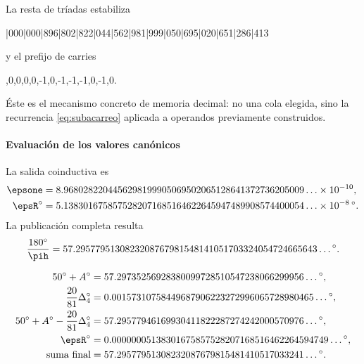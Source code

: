 La resta de tríadas estabiliza
\begin{center}
|000|000|896|802|822|044|562|981|999|050|695|020|651|286|413
\end{center}
y el prefijo de carries
\begin{center}
,0,0,0,0,-1,0,-1,-1,-1,0,-1,0.
\end{center}
Éste es el mecanismo concreto de memoria decimal: no una cola elegida, sino
la recurrencia \eqref{eq:subacarreo} aplicada a operandos previamente
construidos.

\paragraph{Evaluación de los valores canónicos}

La salida coinductiva es
\begin{align}
\epsone
&=8.9680282204456298199905069502065128641372736205009\ldots
\times10^{-10},\\
\epsR^\circ
&=5.1383016758575282071685164622645947489908574400054\ldots
\times10^{-8}\,{}^\circ.
\label{eq:epsilon-valores}
\end{align}
La publicación completa resulta
\[
\frac{180^\circ}{\pih}
=57.2957795130823208767981548141051703324054724665643\ldots{}^\circ.
\]

\begin{exactbox}
\begin{align*}
50^\circ+A^\circ
&=57.29735256928380099728510547238066299956\ldots{}^\circ,\\
\frac{20}{81}\Delta_4^\circ
&=0.00157310758449687906223272996065728980465\ldots{}^\circ,\\
50^\circ+A^\circ-\frac{20}{81}\Delta_4^\circ
&=57.29577946169930411822287274242000570976\ldots{}^\circ,\\
\epsR^\circ
&=0.00000005138301675857528207168516462264594749\ldots{}^\circ,\\
\text{suma final}
&=57.29577951308232087679815481410517033241\ldots{}^\circ.
\end{align*}
\end{exactbox}

